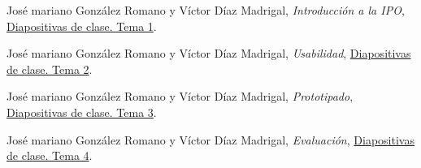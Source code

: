 \documentclass[a4paper,11pt]{article}
\begin{document}
\begin{thebibliography}{99}
  José mariano González Romano y Víctor Díaz Madrigal,
  \textit{Introducción a la IPO},
  \href{https://s3-eu-central-1.amazonaws.com/learn-eu-central-1-prod-fleet01-xythos/5ac734ed505df/1497177?response-content-disposition=inline%3B%20filename%2A%3DUTF-8%27%27IPO-2018-19-01-Introducci%25C3%25B3n%2520a%2520la%2520IPO.pdf&response-content-type=application%2Fpdf&X-Amz-Algorithm=AWS4-HMAC-SHA256&X-Amz-Date=20181009T201303Z&X-Amz-SignedHeaders=host&X-Amz-Expires=21600&X-Amz-Credential=AKIAIZ3QX2YUHH4EOO3A%2F20181009%2Feu-central-1%2Fs3%2Faws4_request&X-Amz-Signature=91e59768c9f86b77180953691bdcae19f7300073d4ad74d0949de1515d0b6f55}{Diapositivas de clase. Tema 1}.

    José mariano González Romano y Víctor Díaz Madrigal,
    \textit{Usabilidad},
    \href{https://s3-eu-central-1.amazonaws.com/learn-eu-central-1-prod-fleet01-xythos/5ac734ed505df/1548262?response-content-disposition=inline%3B%20filename%2A%3DUTF-8%27%27IPO-2018-19-02-Usabilidad.pdf&response-content-type=application%2Fpdf&X-Amz-Algorithm=AWS4-HMAC-SHA256&X-Amz-Date=20181108T092002Z&X-Amz-SignedHeaders=host&X-Amz-Expires=21600&X-Amz-Credential=AKIAIZ3QX2YUHH4EOO3A%2F20181108%2Feu-central-1%2Fs3%2Faws4_request&X-Amz-Signature=b6f88f86fcc8fc9e65cb7762b151621c9d17779d12ea366fa9e6cf74db65f16f}{Diapositivas de clase. Tema 2}.

  José mariano González Romano y Víctor Díaz Madrigal,
  \textit{Prototipado},
  \href{https://s3-eu-central-1.amazonaws.com/learn-eu-central-1-prod-fleet01-xythos/5ac734ed505df/1717656?response-content-disposition=inline%3B%20filename%2A%3DUTF-8%27%27IPO-2018-19-03-Prototipado.pdf&response-content-type=application%2Fpdf&X-Amz-Algorithm=AWS4-HMAC-SHA256&X-Amz-Date=20181108T092046Z&X-Amz-SignedHeaders=host&X-Amz-Expires=21600&X-Amz-Credential=AKIAIZ3QX2YUHH4EOO3A%2F20181108%2Feu-central-1%2Fs3%2Faws4_request&X-Amz-Signature=a298d276e4c75007b2970ddc1e4aa7fa8c92e35d85e8ed270504f153329534cb}{Diapositivas de clase. Tema 3}.

  José mariano González Romano y Víctor Díaz Madrigal,
  \textit{Evaluación},
  \href{https://s3-eu-central-1.amazonaws.com/learn-eu-central-1-prod-fleet01-xythos/5ac734ed505df/1868140?response-content-disposition=inline%3B%20filename%2A%3DUTF-8%27%27IPO-2018-19-04-Evaluaci%25C3%25B3n.pdf&response-content-type=application%2Fpdf&X-Amz-Algorithm=AWS4-HMAC-SHA256&X-Amz-Date=20181108T092127Z&X-Amz-SignedHeaders=host&X-Amz-Expires=21600&X-Amz-Credential=AKIAIZ3QX2YUHH4EOO3A%2F20181108%2Feu-central-1%2Fs3%2Faws4_request&X-Amz-Signature=df3ee954b039d2239e0947995469951f22d0bd91826341575b083d05e3865ccc}{Diapositivas de clase. Tema 4}.


\end{thebibliography}
\end{document}
